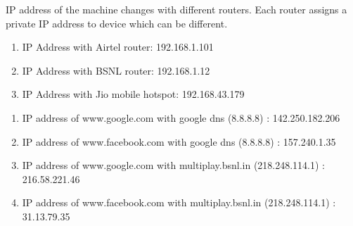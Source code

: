 \documentclass[]{assignment}
\begin{document}
\maketitle
{}
    \begin{alphaparts}
        \questionpart IP address of the machine changes with different routers. Each router assigns a private IP address to device which can be different. 
            \begin{enumerate}
                \item IP Address with Airtel router: 192.168.1.101
                \item IP Address with BSNL router: 192.168.1.12 
                \item IP Address with Jio mobile hotspot: 192.168.43.179
            \end{enumerate}
        \questionpart 
            \begin{enumerate}
                \item IP address of www.google.com with google dns (8.8.8.8) : 142.250.182.206
                \item IP address of www.facebook.com with google dns (8.8.8.8) : 157.240.1.35  
                \item IP address of www.google.com with multiplay.bsnl.in (218.248.114.1) : 216.58.221.46 
                \item IP address of www.facebook.com with multiplay.bsnl.in (218.248.114.1) : 31.13.79.35 
            \end{enumerate}


\end{alphaparts}
\end{document}
